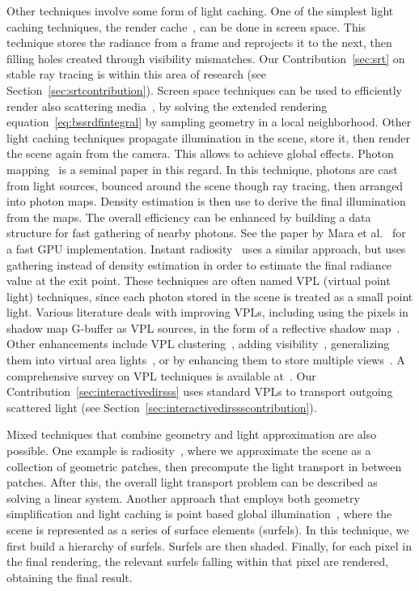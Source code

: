 Other techniques involve some form of light caching. One of the simplest light caching techniques, the render cache~\cite{Walter2002}, can be done in screen space. This technique stores the radiance from a frame and reprojects it to the next, then filling holes created through visibility mismatches. Our Contribution~\ref{sec:srt} on stable ray tracing is within this area of research (see Section~\ref{sec:srtcontribution}). Screen space techniques can be used to efficiently render also scattering media~\cite{Nalbach2014}, by solving the extended rendering equation~\ref{eq:bssrdfintegral} by sampling geometry in a local neighborhood. Other light caching techniques propagate illumination in the scene, store it, then render the scene again from the camera. This allows to achieve global effects. Photon mapping~\cite{Jensen1996} is a seminal paper in this regard. In this technique, photons are cast from light sources, bounced around the scene though ray tracing, then arranged into photon maps. Density estimation is then use to derive the final illumination from the maps. The overall efficiency can be enhanced by building a data structure for fast gathering of nearby photons. See the paper by Mara et al.~\cite{Mara2013} for a fast GPU implementation. Instant radiosity~\cite{Keller1997} uses a similar approach, but uses gathering instead of density estimation in order to estimate the final radiance value at the exit point. These techniques are often named VPL (virtual point light) techniques, since each photon stored in the scene is treated as a small point light. Various literature deals with improving VPLs, including using the pixels in shadow map G-buffer as VPL sources, in the form of a reflective shadow map~\cite{Frisvad2005,Dachsbacher2005}. Other enhancements include VPL clustering~\cite{Walter2005, Bus2015}, adding visibility~\cite{Ritschel2008}, generalizing them into virtual area lights~\cite{Dong09}, or by enhancing them to store multiple views~\cite{Simon2015}. A comprehensive survey on VPL techniques is available at~\cite{Dachsbacher2014}. Our Contribution~\ref{sec:interactivedirsss} uses standard VPLs to transport outgoing scattered light (see Section~\ref{sec:interactivedirssscontribution}).

Mixed techniques that combine geometry and light approximation are also possible. One example is radiosity~\cite{Goral1984}, where we approximate the scene as a collection of geometric patches, then precompute the light transport in between patches. After this, the overall light transport problem can be described as solving a linear system. Another approach that employs both geometry simplification and light caching is point based global illumination~\cite{Bunnel2005, Christensen2008}, where the scene is represented as a series of surface elements (surfels). In this technique, we first build a hierarchy of surfels. Surfels are then shaded. Finally, for each pixel in the final rendering, the relevant surfels falling within that pixel are rendered, obtaining the final result. 

